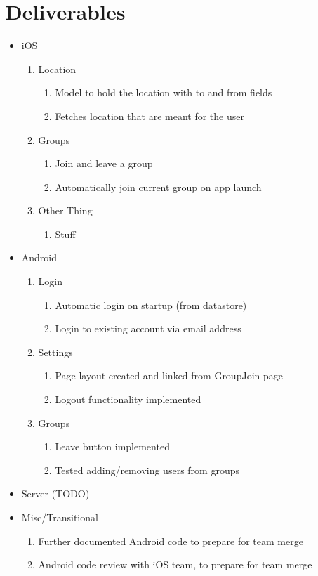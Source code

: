 \documentclass[11pt]{article}
\begin{document}
\section*{Deliverables}
	\begin{itemize}
	\item iOS
		\begin{enumerate}
		\item Location
			\begin{enumerate}
			\item Model to hold the location with to and from fields
			\item Fetches location that are meant for the user
			\end{enumerate}
		\item Groups
			\begin{enumerate}
			\item Join and leave a group
			\item Automatically join current group on app launch
			\end{enumerate}
		\item Other Thing
			\begin{enumerate}
			\item Stuff
			\end{enumerate}
		\end{enumerate}
		
	\item Android
		\begin{enumerate}
		\item Login
			\begin{enumerate}
			\item Automatic login on startup (from datastore)
			\item Login to existing account via email address
			\end{enumerate}
		\item Settings
			\begin{enumerate}
			\item Page layout created and linked from GroupJoin page
			\item Logout functionality implemented
			\end{enumerate}
		\item Groups
			\begin{enumerate}
			\item Leave button implemented
			\item Tested adding/removing users from groups
			\end{enumerate}
		\end{enumerate}
	\item Server
		(TODO)

	\item Misc/Transitional
		\begin{enumerate}
			\item Further documented Android code to prepare for team merge
			\item Android code review with iOS team, to prepare for team merge
		\end{enumerate}

	\end{itemize}
\end{document}

